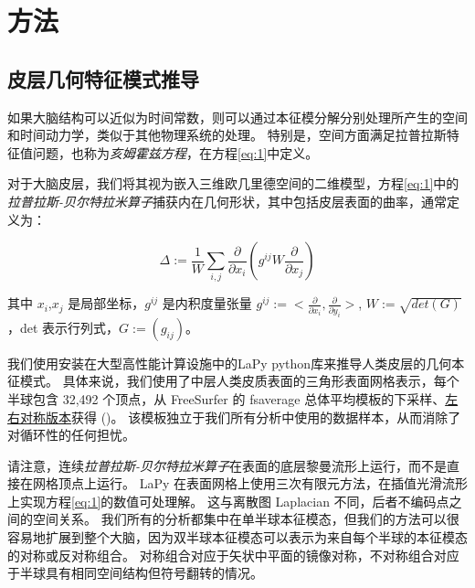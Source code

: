 \documentclass[lang=cn,a4paper,newtx]{elegantpaper}
\begin{document}
\section{方法} \label{sec:method}

\subsection{皮层几何特征模式推导} \label{sec:derivation}

如果大脑结构可以近似为时间常数，则可以通过本征模分解\cite{nowack1995neocortical,robinson2016eigenmodes}分别处理所产生的空间和时间动力学，类似于其他物理系统的处理\cite{melrose1991electromagnetic}。
特别是，空间方面满足拉普拉斯特征值问题，也称为\textit{亥姆霍兹方程}，在方程\ref{eq:1}中定义。


对于大脑皮层，我们将其视为嵌入三维欧几里德空间的二维模型，方程\ref{eq:1}中的\textit{拉普拉斯-贝尔特拉米算子}捕获内在几何形状，其中包括皮层表面的曲率\cite{wachinger2015brainprint}，通常定义为\cite{chavel1984eigenvalues,seo2011laplace}：


\begin{equation}\label{eq:surface_curvature}
	\Delta:=\frac{1}{W} \sum_{i,j} \frac{\partial}{\partial x_i} (g^{ij} W \frac{\partial}{\partial x_j})
\end{equation}

其中 $ x_i $,$ x_j $ 是局部坐标，$ g^{ij} $ 是内积度量张量 $ g^{ij}:=<\frac{\partial}{\partial x_i}, \frac{\partial}{\partial y_i}> $, $ W:=\sqrt{det(G)} $，det 表示行列式，$ G:=(g_{ij}) $。


我们使用安装在大型高性能计算设施\cite{goscinski2014multi}中的LaPy python库\cite{wachinger2015brainprint,reuter2006laplace}来推导人类皮层的几何本征模式。 
具体来说，我们使用了中层人类皮质表面的三角形表面网格表示，每个半球包含 32,492 个顶点，从 FreeSurfer 的 fsaverage 总体平均模板的下采样、\href{https://github.com/ ThomasYeoLab/CBIG/tree/master/data/templates/surface/fs_LR_32k}{左右对称版本}获得\cite{fischl1999high} ()。
该模板独立于我们所有分析中使用的数据样本，从而消除了对循环性的任何担忧。


请注意，连续\textit{拉普拉斯-贝尔特拉米算子}在表面的底层黎曼流形上运行，而不是直接在网格顶点上运行。
LaPy 在表面网格上使用三次有限元方法，在插值光滑流形上实现方程\ref{eq:1}的数值可处理解。
这与离散图 Laplacian \cite{shuman2013emerging} 不同，后者不编码点之间的空间关系。
我们所有的分析都集中在单半球本征模态，但我们的方法可以很容易地扩展到整个大脑，因为双半球本征模态可以表示为来自每个半球的本征模态的对称或反对称组合。
对称组合对应于矢状中平面的镜像对称，不对称组合对应于半球具有相同空间结构但符号翻转的情况。
\end{document}
